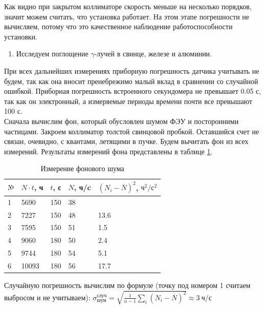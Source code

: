 \documentclass[a4paper,12pt]{article}
\begin{document}
Как видно при закрытом коллиматоре скорость меньше на несколько порядков, значит можем считать, что установка работает. На этом этапе погрешности не вычисляем, потому что это качественное наблюдение работоспособности установки.


\begin{enumerate}[resume]
    \item Исследуем поглощение $\gamma$-лучей в свинце, железе и алюминии.
\end{enumerate}

При всех дальнейших измерениях приборную погрешность датчика учитывать не будем, так как она вносит пренебрежимо малый вклад в сравнении со случайной ошибкой. Приборная погрешность встроенного секундомера не превышает 0.05 с, так как он электронный, а измеряемые периоды времени почти все превышают 100 с. \\

Сначала вычислим фон, который обусловлен шумом ФЭУ и посторонними частицами. Закроем коллиматор толстой свинцовой пробкой. Оставшийся счет не связан, очевидно, с квантами, летящими в пучке. Будем вычитать фон из всех измерений. Результаты измерений фона представлены в таблице \ref{table:2}.

\FloatBarrier
\begin{table}[!ht]
    \centering
    \begin{tabular}{|l|l|l|l|l|}
        \hline
        $№$ & $N \cdot t$, ч & $t$, с & $N$, ч/c & $\left(N_i - \overline{N}\right)^2$, $\text{ч}^2/\text{с}^2$ \\ \hline
        1   & 5690  & 150 & 38 & ~ \\ \hline
        2   & 7227  & 150 & 48 & 13.6  \\ \hline
        3   & 7595  & 150 & 51 & 1.5   \\ \hline
        4   & 9060  & 180 & 50 & 2.4   \\ \hline
        5   & 9744  & 180 & 54 & 5.1   \\ \hline
        6   & 10093 & 180 & 56 & 17.7  \\ \hline
    \end{tabular}
    \caption{Измерение фонового шума}
    \label{table:2}
\end{table}
\FloatBarrier

Случайную погрешность вычислим по формуле (точку под номером 1 считаем выбросом и не учитываем): $\sigma^\text{случ}_\text{шум} = \sqrt{\frac{1}{n - 1} \sum\limits_{i} \left(N_i - \overline{N}\right)^2} \approx 3 \ \text{ч}/\text{с}$ \\
\end{document}
